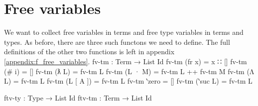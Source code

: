 \documentclass[logo,bsc,singlespacing,parskip,online]{infthesis}
\renewenvironment{code}{\mintedcopy[breaklines,breaksymbolleft=\;]{agda}}{\endmintedcopy}
\begin{document}
\section{Free variables}
We want to collect free variables in terms and free type variables in terms and types. As before,
there are three such functons we need to define. The full definitions of the other two functions is
left in appendix \ref{appendix:f_free_variables}.
\begin{code}
  fv-tm : Term → List Id
  fv-tm (fr x) = x ∷ []
  fv-tm (# i) = []
  fv-tm (ƛ L) = fv-tm L
  fv-tm (L · M) = fv-tm L ++ fv-tm M
  fv-tm (Λ L) = fv-tm L
  fv-tm (L [ A ]) = fv-tm L
  fv-tm ‵zero = []
  fv-tm (‵suc L) = fv-tm L

  ftv-ty : Type → List Id
  ftv-tm : Term → List Id
\end{code}
\begin{comment}
\begin{code}
  -- We're actually gonna something really sneaky here.
  -- We're including the full body here because Agda needs it to
  -- be defined so that it can use the definition in later proofs.
  -- So I'm just gonna copy-paste the body as non-Agda code later.

  ftv-ty ‵ℕ = []
  ftv-ty (t-fr x) = x ∷ []
  ftv-ty (t-# i) = []
  ftv-ty (A ⇒ B) = ftv-ty A ++ ftv-ty B
  ftv-ty (t-∀ A) = ftv-ty A

  ftv-tm (fr x) = []
  ftv-tm (# i) = []
  ftv-tm (ƛ L) = ftv-tm L
  ftv-tm (L · M) = ftv-tm L ++ ftv-tm M
  ftv-tm (Λ L) = ftv-tm L
  ftv-tm (L [ A ]) = ftv-tm L ++ ftv-ty A
  ftv-tm ‵zero = []
  ftv-tm (‵suc L) = ftv-tm L
\end{code}
\end{comment}
\end{document}
